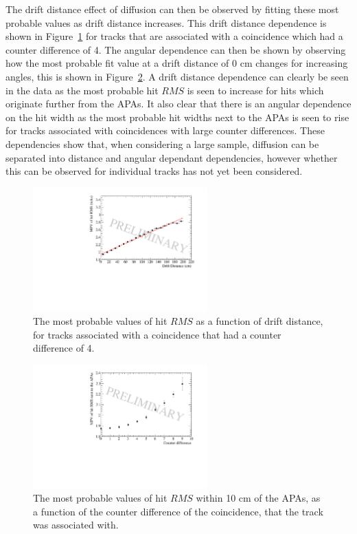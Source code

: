 The drift distance effect of diffusion can then be observed by fitting these most probable values as drift distance increases. This drift distance dependence is shown in Figure~\ref{fig:CDiff4DataFit} for tracks that are associated with a coincidence which had a counter difference of 4. The angular dependence can then be shown by observing how the most probable fit value at a drift distance of 0 cm changes for increasing angles, this is shown in Figure~\ref{fig:DiffData_AngFit}. A drift distance dependence can clearly be seen in the data as the most probable hit $RMS$ is seen to increase for hits which originate further from the APAs. It also clear that there is an angular dependence on the hit width as the most probable hit widths next to the APAs is seen to rise for tracks associated with coincidences with large counter differences. These dependencies show that, when considering a large sample, diffusion can be separated into distance and angular dependant dependencies, however whether this can be observed for individual tracks has not yet been considered. \\

\begin{figure}[h!]
  \centering
  \includegraphics[width=0.6\textwidth]{CounterDiff4_Data}
  \caption[The drift distance dependence of diffusion in the 35 ton dataset for coincidences with a counter difference of 4]
          {The most probable values of hit $RMS$ as a function of drift distance, for tracks associated with a coincidence that had a counter difference of 4.}
  \label{fig:CDiff4DataFit}
\end{figure}

\begin{figure}[h!]
  \centering
  \includegraphics[width=0.6\textwidth]{InterceptCanvasData}
  \caption[The angular dependence of diffusion in the 35 ton dataset for hits within 10 cm of the APAs]
          {The most probable values of hit $RMS$ within 10 cm of the APAs, as a function of the counter difference of the coincidence, that the track was associated with.}
  \label{fig:DiffData_AngFit}
\end{figure}

